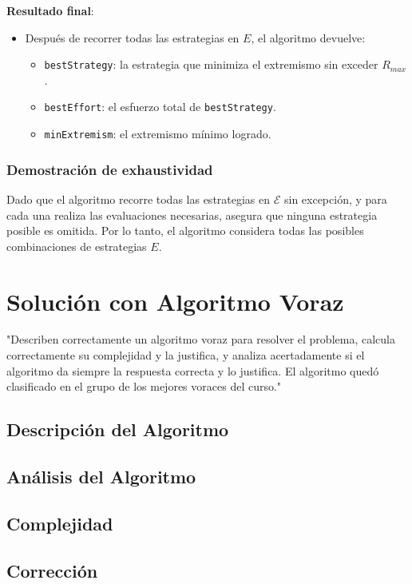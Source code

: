 \documentclass[letterpaper,10pt]{article}
\begin{document}
\textbf{Resultado final}:
\begin{itemize}
    \item Después de recorrer todas las estrategias en $E$, el algoritmo devuelve:
    \begin{itemize}
        \item \texttt{bestStrategy}: la estrategia que minimiza el extremismo sin exceder $R_{max}$.
        \item \texttt{bestEffort}: el esfuerzo total de \texttt{bestStrategy}.
        \item \texttt{minExtremism}: el extremismo mínimo logrado.
    \end{itemize}
\end{itemize}

\subsubsection*{Demostración de exhaustividad}

Dado que el algoritmo recorre todas las estrategias en $\mathcal{E}$ sin excepción, y para cada una realiza las evaluaciones necesarias, asegura que ninguna estrategia posible es omitida. Por lo tanto, el algoritmo considera todas las posibles combinaciones de estrategias $E$.

\section{Solución con Algoritmo Voraz}
\label{sec:algoritmo_voraz}
"Describen correctamente un algoritmo voraz para resolver el problema, calcula correctamente su complejidad y la justifica, y analiza acertadamente si el algoritmo da siempre la respuesta correcta y lo justifica. El algoritmo quedó clasificado en el grupo de los mejores voraces del curso."
\subsection{Descripción del Algoritmo}
\label{subsec:descripcion_algoritmo_voraz}
\subsection{Análisis del Algoritmo}
\label{subsec:analisis_algoritmo_voraz}
\subsection{Complejidad}
\label{subsec:complejidad_algoritmo_voraz}
\subsection{Corrección}
\label{subsec:correccion_algoritmo_voraz}
\end{document}
